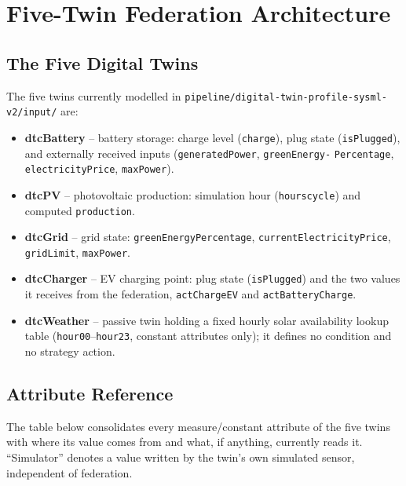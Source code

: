 \documentclass[11pt]{article}
\renewcommand{\_}{\textunderscore\allowbreak}
\begin{document}
\section{Five-Twin Federation Architecture}
\label{sec:five-twin}

\subsection{The Five Digital Twins}

The five twins currently modelled in
\texttt{pipeline/digital-twin-profile-sysml-v2/input/} are:

\begin{itemize}[nosep]
  \item \textbf{dtcBattery} -- battery storage: charge level
        (\texttt{charge}), plug state (\texttt{isPlugged}), and externally
        received inputs (\texttt{generatedPower}, \texttt{greenEnergy-}
        \texttt{Percentage}, \texttt{electricityPrice}, \texttt{maxPower}).
  \item \textbf{dtcPV} -- photovoltaic production: simulation hour
        (\texttt{hours\_cycle}) and computed \texttt{production}.
  \item \textbf{dtcGrid} -- grid state: \texttt{greenEnergyPercentage},
        \texttt{currentElectricityPrice}, \texttt{gridLimit},
        \texttt{maxPower}.
  \item \textbf{dtcCharger} -- EV charging point: plug state
        (\texttt{isPlugged}) and the two values it receives from the
        federation, \texttt{actChargeEV} and \texttt{actBatteryCharge}.
  \item \textbf{dtcWeather} -- passive twin holding a fixed hourly solar
        availability lookup table (\texttt{hour00}--\texttt{hour23}, constant
        attributes only); it defines no condition and no strategy action.
\end{itemize}

\subsection{Attribute Reference}
\label{sec:attributes}

The table below consolidates every measure/constant attribute of the five
twins with where its value comes from and what, if anything, currently reads
it. ``Simulator'' denotes a value written by the twin's own simulated
sensor, independent of federation.
\end{document}

